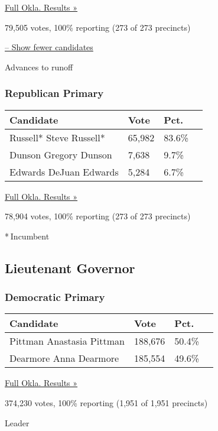 \href{https://www.nytimes3xbfgragh.onion/elections/results/oklahoma}{Full
Okla. Results »}

79,505 votes, 100\% reporting (273 of 273 precincts)

\protect\hyperlink{}{-- Show fewer candidates}

 Advances to runoff

\hypertarget{republican-primary-5}{%
\subsubsection{Republican Primary}\label{republican-primary-5}}

\begin{longtable}[]{@{}llll@{}}
\toprule
Candidate & Vote & Pct. &\tabularnewline
\midrule
\endhead
 Russell* Steve Russell* & 65,982 & 83.6\% &\tabularnewline
 Dunson Gregory Dunson & 7,638 & 9.7\% &\tabularnewline
 Edwards DeJuan Edwards & 5,284 & 6.7\% &\tabularnewline
\bottomrule
\end{longtable}

\href{https://www.nytimes3xbfgragh.onion/elections/results/oklahoma}{Full
Okla. Results »}

78,904 votes, 100\% reporting (273 of 273 precincts)

* Incumbent

\hypertarget{lieutenant-governor}{%
\subsection{Lieutenant Governor}\label{lieutenant-governor}}

\hypertarget{democratic-primary-6}{%
\subsubsection{Democratic Primary}\label{democratic-primary-6}}

\begin{longtable}[]{@{}llll@{}}
\toprule
Candidate & Vote & Pct. &\tabularnewline
\midrule
\endhead
 Pittman Anastasia Pittman & 188,676 & 50.4\% &\tabularnewline
 Dearmore Anna Dearmore & 185,554 & 49.6\% &\tabularnewline
\bottomrule
\end{longtable}

\href{https://www.nytimes3xbfgragh.onion/elections/results/oklahoma}{Full
Okla. Results »}

374,230 votes, 100\% reporting (1,951 of 1,951 precincts)

Leader

